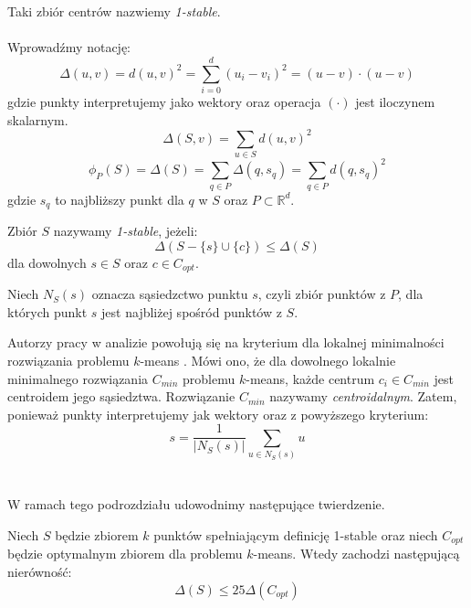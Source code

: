 Taki zbiór centrów nazwiemy \textit{1-stable}.
\\~\\
Wprowadźmy notację:
\begin{equation}
    \Delta(u, v) = d(u, v)^{2} = \sum_{i=0}^{d} (u_{i} - v_{i})^2 = (u - v)\cdot(u - v)
\end{equation}
gdzie punkty interpretujemy jako wektory oraz operacja $(\cdot)$ jest iloczynem skalarnym.
\begin{equation}
    \Delta(S, v) = \sum_{u \in S} d(u, v)^{2}
\end{equation}
\begin{equation}
    \phi_{P}(S) = \Delta(S) = \sum_{q \in P} \Delta(q,s_{q}) = \sum_{q \in P} d(q, s_{q})^{2}
\end{equation}
gdzie $s_{q}$ to najbliższy punkt dla $q$ w $S$ oraz $P \subset \mathbb{R}^{d}$. 

\begin{definition}
    Zbiór $S$ nazywamy \emph{1-stable}, jeżeli:
    \begin{equation}
        \Delta(S - \{s\} \cup \{c\}) \leq \Delta(S)
    \end{equation}
    dla dowolnych $s \in S$ oraz $c \in C_{opt}$.
\end{definition}

\begin{definition}
    Niech $N_{S}(s)$ oznacza sąsiedzctwo punktu $s$, czyli zbiór punktów z $P$, dla których punkt $s$ jest najbliżej spośród punktów z $S$.
\end{definition}

\noindent
Autorzy pracy \cite{Arya2004LocalSH} w analizie powołują się na kryterium dla lokalnej minimalności rozwiązania problemu $k$-means \cite{doi:10.1137/S0036144599352836}.
Mówi ono, że dla dowolnego lokalnie minimalnego rozwiązania $C_{min}$ problemu $k$-means, każde centrum $c_{i} \in C_{min}$ jest centroidem jego sąsiedztwa.
Rozwiązanie $C_{min}$ nazywamy \textit{centroidalnym}.
Zatem, ponieważ punkty interpretujemy jak wektory oraz z powyższego kryterium:
\begin{equation}
    s = \frac{1}{|N_{S}(s)|}\sum_{u \in N_{S}(s)} u
\end{equation}
\\~\\
W ramach tego podrozdziału udowodnimy następujące twierdzenie.

\begin{thm}{\cite{Arya2004LocalSH}}
    Niech $S$ będzie zbiorem $k$ punktów spełniającym definicję 1-stable oraz niech $C_{opt}$ będzie optymalnym zbiorem dla problemu $k$-means.
    Wtedy zachodzi następującą nierówność:
    \begin{equation}
        \Delta(S) \leq 25 \Delta(C_{opt})
    \end{equation} 
\end{thm}

